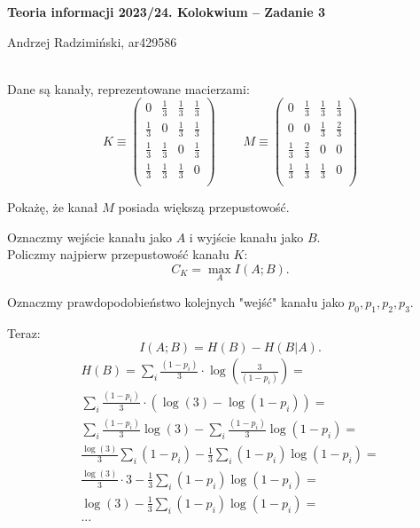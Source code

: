 


\setlength{\parindent}{0pt}
\noindent

{\bf Teoria informacji 2023/24. Kolokwium -- Zadanie 3}

Andrzej Radzimiński, ar429586
\\

\ \\

\newcommand{\ot}{\frac{1}{3}}
\newcommand{\twt}{\frac{2}{3}}

\renewcommand*{\arraystretch}{1.5}

Dane są kanały, reprezentowane macierzami:
$$
K \equiv
\begin{pmatrix}
	0   & \ot & \ot & \ot \\
	\ot & 0   & \ot & \ot \\
	\ot & \ot & 0   & \ot \\
	\ot & \ot & \ot & 0   \\
\end{pmatrix}
\ \ \ \ \ \ \ \ \ \  
M \equiv 
\begin{pmatrix}
	0   & \ot & \ot & \ot \\
	0   & 0   & \ot & \twt \\
	\ot & \twt& 0   & 0  \\
	\ot & \ot & \ot & 0   \\
\end{pmatrix}
$$

Pokażę, że kanał $M$ posiada większą przepustowość.

Oznaczmy wejście kanału jako $A$ i wyjście kanału jako $B$.\\

Policzmy najpierw przepustowość kanału $K$:
$$
	C_K = \max_{A} I(A; B).
$$

Oznaczmy prawdopodobieństwo kolejnych "wejść" kanału jako
$p_0, p_1, p_2, p_3$.

Teraz:
$$
	I(A; B) = H(B) - H(B | A).
$$
\begin{multline*}
	H(B) =
	\sum_{i} \frac{(1-p_{i})}{3} \cdot \log\left(\frac{3}{(1-p_{i})} \right) = \\
	\sum_{i} \frac{(1-p_{i})}{3} \cdot \left(\log(3) - \log(1-p_{i}) \right) = \\
	\sum_{i} \frac{(1-p_{i})}{3}\log(3) - \sum_{i} \frac{(1-p_{i})}{3}\log(1-p_{i}) = \\
	\frac{\log(3)}{3} \sum_{i} (1-p_{i}) - \frac{1}{3}\sum_{i} (1-p_{i})\log(1-p_{i}) = \\
	\frac{\log(3)}{3} \cdot 3 - \frac{1}{3}\sum_{i} (1-p_{i})\log(1-p_{i}) = \\
	\log(3) - \frac{1}{3}\sum_{i} (1-p_{i})\log(1-p_{i}) = \\ ...
\end{multline*}

